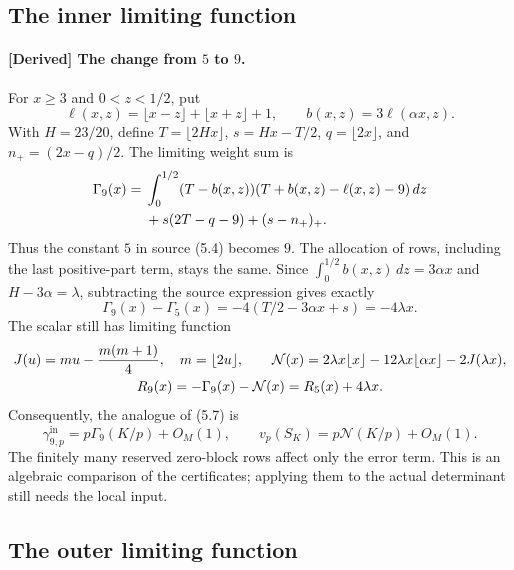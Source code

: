 \subsection{The inner limiting function}
\label{s5-inner}

\paragraph{[Derived] The change from $5$ to $9$.}
For $x\geq3$ and $0<z<1/2$, put
\[
 \ell(x,z)=\lfloor x-z\rfloor+\lfloor x+z\rfloor+1,
 \qquad b(x,z)=3\ell(\alpha x,z).
\]
With $H=23/20$, define
$T=\lfloor2Hx\rfloor$, $s=Hx-T/2$, $q=\lfloor2x\rfloor$,
and $n_+=(2x-q)/2$.  The limiting weight sum is
\begin{align}
 \Gamma_9(x)={}&\int_0^{1/2}(T-b(x,z))
       (T+b(x,z)-\ell(x,z)-9)\,dz\notag\\
 &+s(2T-q-9)+(s-n_+)_+.
 \label{s5-gamma9}
\end{align}
Thus the constant $5$ in source (5.4) becomes $9$.  The allocation of
rows, including the last positive-part term, stays the same.  Since
$\int_0^{1/2}b(x,z)\,dz=3\alpha x$ and $H-3\alpha=\lambda$,
subtracting the source expression gives exactly
\[
 \Gamma_9(x)-\Gamma_5(x)
 =-4\left(T/2-3\alpha x+s\right)=-4\lambda x.
\]
The scalar still has limiting function
\begin{gather}
 J(u)=mu-\frac{m(m+1)}4,\quad m=\lfloor2u\rfloor,\qquad
 \mathcal N(x)=2\lambda x\lfloor x\rfloor
 -12\lambda x\lfloor\alpha x\rfloor-2J(\lambda x),\notag\\
 R_9(x)=-\Gamma_9(x)-\mathcal N(x)=R_5(x)+4\lambda x.
 \label{s5-r9-shift}
\end{gather}
Consequently, the analogue of (5.7) is
\[
 \gamma^{\mathrm{in}}_{9,p}=p\Gamma_9(K/p)+O_M(1),\qquad
 v_p(S_K)=p\mathcal N(K/p)+O_M(1).
\]
The finitely many reserved zero-block rows affect only the error term.
This is an algebraic comparison of the certificates; applying them to
the actual determinant still needs the local input.

\subsection{The outer limiting function}
\label{s5-outer}

